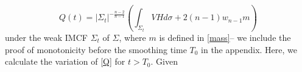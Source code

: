 \documentclass[12pt,twoside]{article}
\theoremstyle{plain}
\theoremstyle{definition}
\theoremstyle{remark}
\numberwithin{equation}{section}
\begin{document}
\begin{equation} \label{Q}
    Q(t) = |\Sigma_{t}|^{-\frac{n-2}{n-1}} \left( \int_{\Sigma_{t}} VH d\sigma + 2(n-1) w_{n-1} m \right)
\end{equation}
under the weak IMCF $\Sigma_{t}$ of $\Sigma$, where $m$ is defined in \eqref{mass}-- we include the proof of monotonicity before the smoothing time $T_{0}$ in the appendix. Here, we calculate the variation of \eqref{Q} for $t > T_{0}$. Given


\end{document}
